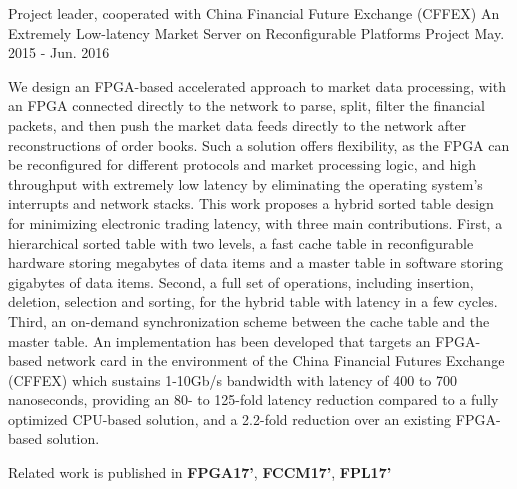 \documentclass[11pt, a4paper]{awesome-cv}
\begin{document}
\begin{cventries}
  \cventry
    {Project leader, cooperated with China Financial Future Exchange (CFFEX)} %
    {An Extremely Low-latency Market Server on Reconfigurable Platforms} %
    {Project} %
    {May. 2015 - Jun. 2016} %
    {
      \begin{cvitems} %
        \item {We design an FPGA-based accelerated approach to market data processing, with an FPGA connected directly to the network to parse, split, filter the financial packets, and then push the market data feeds directly to the network after reconstructions of order books. Such a solution offers flexibility, as the FPGA can be reconfigured for different protocols and market processing logic, and high throughput with extremely low latency by eliminating the operating system's interrupts and network stacks. This work proposes a hybrid sorted table design for minimizing electronic trading latency, with three main contributions. First, a hierarchical sorted table with two levels, a fast cache table in reconfigurable hardware storing megabytes of data items and a master table in software storing gigabytes of data items. Second, a full set of operations, including insertion, deletion, selection and sorting, for the hybrid table with latency in a few cycles.  Third, an on-demand synchronization scheme between the cache table and the master table. An implementation has been developed that targets an FPGA-based network card in the environment of the China Financial Futures Exchange (CFFEX) which sustains 1-10Gb/s bandwidth with latency of 400 to 700 nanoseconds, providing an 80- to 125-fold latency reduction compared to a fully optimized CPU-based solution, and a 2.2-fold reduction over an existing FPGA-based solution.}
       \item {Related work is published in \textbf{FPGA17'}, \textbf{FCCM17'}, \textbf{FPL17'}}
      \end{cvitems}
    }


\end{cventries}
\end{document}
